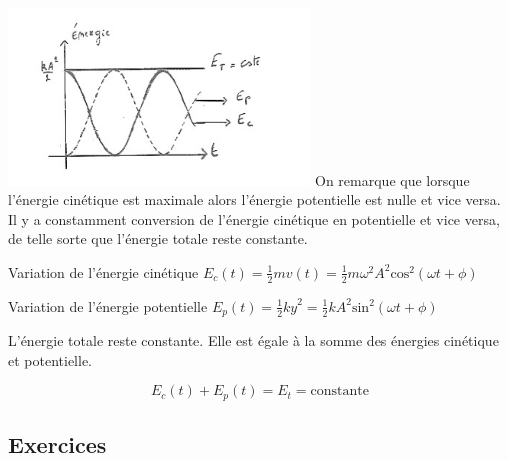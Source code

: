 \begin{multicols}{2}
\begin{center}
\begin{minipage}{8.89cm}
\includegraphics[width=8cm]{COURS2EnergieOHEXERCRESOL-img/COURS2EnergieOHEXERCRESOL-img001.png}
On remarque que lorsque l’énergie cinétique est maximale alors l’énergie potentielle
est nulle et vice versa. Il y a constamment conversion de l’énergie cinétique en potentielle et vice versa, de telle
sorte que l’énergie totale reste constante. 
\end{minipage}
\end{center}

Variation de l’énergie cinétique   $E_c(t)=\frac{1}{2}mv(t)=\frac{1}{2}m\omega ^2A^2\text{cos}^2(\omega t+\phi )$

Variation de l’énergie potentielle  $E_p(t)=\frac{1}{2}\mathit{ky}^2=\frac{1}{2}kA^2\text{sin}^2(\omega t+\phi )$

L’énergie totale reste constante. Elle est égale à la somme des énergies cinétique et potentielle. 

\begin{equation*}
E_c(t)+E_p(t)=E_t=\text{constante}
\end{equation*}


\subsection{Exercices}


\end{multicols}
